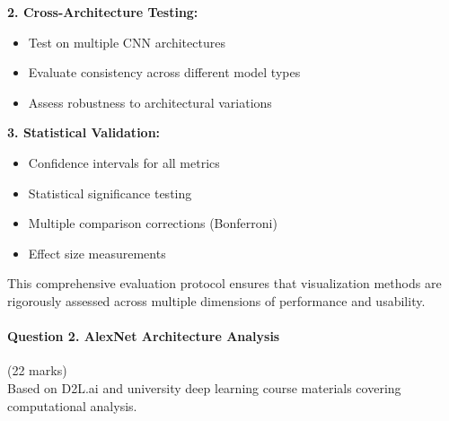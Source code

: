 \documentclass[12pt]{article}
\begin{document}
\begin{enumerate}[(a)]
{    \textbf{2. Cross-Architecture Testing:}
    \begin{itemize}
        \item Test on multiple CNN architectures
        \item Evaluate consistency across different model types
        \item Assess robustness to architectural variations
    \end{itemize}
    
    \textbf{3. Statistical Validation:}
    \begin{itemize}
        \item Confidence intervals for all metrics
        \item Statistical significance testing
        \item Multiple comparison corrections (Bonferroni)
        \item Effect size measurements
    \end{itemize}
    
    This comprehensive evaluation protocol ensures that visualization methods are rigorously assessed across multiple dimensions of performance and usability.
    }
\end{enumerate}

\newpage
\paragraph{Question 2. AlexNet Architecture Analysis}{\hfill (22 marks)}\\
Based on D2L.ai and university deep learning course materials covering computational analysis.
\end{document}
